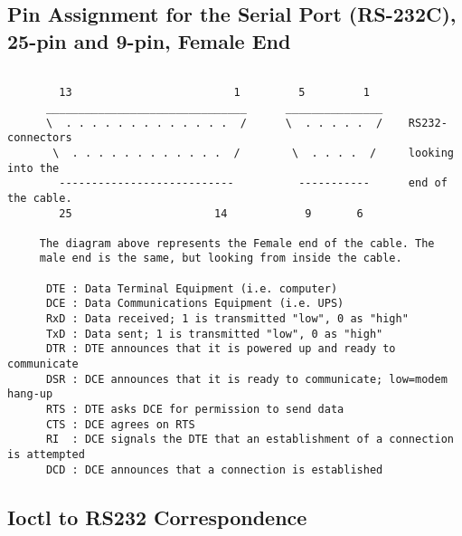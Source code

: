 \begin{longtable}{llll}
\end{longtable}

\label{Pin-Assignment-for-the-Serial-Port-_005bRS_002d232C_005d_003b-25_002dpi%
n-and-9_002dpin_003b-Female-End}

\subsection*{Pin Assignment for the Serial Port (RS-232C), 25-pin and
9-pin, Female End}

\label{index-Cables-217}

\footnotesize
\begin{verbatim}
     
        13                         1         5         1
      _______________________________      _______________
      \  . . . . . . . . . . . . .  /      \  . . . . .  /    RS232-connectors
       \  . . . . . . . . . . . .  /        \  . . . .  /     looking into the
        ---------------------------          -----------      end of the cable.
        25                      14            9       6
     
     The diagram above represents the Female end of the cable. The
     male end is the same, but looking from inside the cable.
     
      DTE : Data Terminal Equipment (i.e. computer)
      DCE : Data Communications Equipment (i.e. UPS)
      RxD : Data received; 1 is transmitted "low", 0 as "high"
      TxD : Data sent; 1 is transmitted "low", 0 as "high"
      DTR : DTE announces that it is powered up and ready to communicate
      DSR : DCE announces that it is ready to communicate; low=modem hang-up
      RTS : DTE asks DCE for permission to send data
      CTS : DCE agrees on RTS
      RI  : DCE signals the DTE that an establishment of a connection is attempted
      DCD : DCE announces that a connection is established
\end{verbatim}
\normalsize

\label{Ioctl-to-RS232-Correspondence}

\subsection*{Ioctl to RS232 Correspondence}

